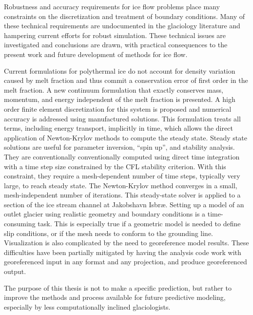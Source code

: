 Robustness and accuracy requirements for ice flow problems place many constraints on the discretization and treatment of boundary conditions.
Many of these technical requirements are undocumented in the glaciology literature and hampering current efforts for robust simulation.
These technical issues are investigated and conclusions are drawn, with practical consequences to the present work and future development of methods for ice flow.

Current formulations for polythermal ice do not account for density variation caused by melt fraction and thus commit a conservation error of first order in the melt fraction.
A new continuum formulation that exactly conserves mass, momentum, and energy independent of the melt fraction is presented.
A high order finite element discretization for this system is proposed and numerical accuracy is addressed using manufactured solutions.
This formulation treats all terms, including energy transport, implicitly in time, which allows the direct application of Newton-Krylov methods to compute the steady state.
Steady state solutions are useful for parameter inversion, ``spin up'', and stability analysis.
They are conventionally conventionally computed using direct time integration with a time step size constrained by the CFL stability criterion.
With this constraint, they require a mesh-dependent number of time steps, typically very large, to reach steady state.
The Newton-Krylov method converges in a small, mesh-independent number of iterations.
This steady-state solver is applied to a section of the ice stream channel at Jakobshavn Isbr{\ae}.
Setting up a model of an outlet glacier using realistic geometry and boundary conditions is a time-consuming task.
This is especially true if a geometric model is needed to define slip conditions, or if the mesh needs to conform to the grounding line.
Visualization is also complicated by the need to georeference model results.
These difficulties have been partially mitigated by having the analysis code work with georeferenced input in any format and any projection, and produce georeferenced output.

The purpose of this thesis is not to make a specific prediction, but rather to improve the methods and process available for future predictive modeling, especially by less computationally inclined glaciologists.
